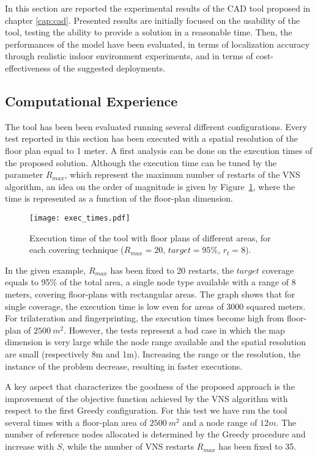 In this section are reported the experimental results of the CAD tool proposed in chapter \ref{cap:cad}.
Presented results are initially focused on the usability of the tool, testing the ability to provide a solution in a reasonable time. Then, the performances of the model have been evaluated, in terms of localization accuracy through realistic indoor environment experiments, and in terms of cost-effectiveness of the suggested deployments.

\subsection{Computational Experience}\label{subsec:comp_res}
The tool has been been evaluated running several different configurations. Every test reported in this section has been executed with a spatial resolution of the floor plan equal to 1 meter.  A first analysis can be done on the execution times of the proposed solution. Although the execution time can be tuned by the parameter $R_{max}$, which represent the maximum number of restarts of the VNS algorithm, an idea on the order of magnitude is given by Figure~\ref{fig:time}, where the time is represented as a function of the floor-plan dimension.
\begin{figure}[h!tb]
\centering\texttt{[image: exec\_times.pdf]}
\caption{Execution time of the tool with floor plans of different areas, for each covering technique ($R_{max} = 20$, $target = 95\%$, $r_t=8$).}
\label{fig:time}
\end{figure}
In the given example, $R_{max}$ has been fixed to 20 restarts, the $target$ coverage equals to 95\% of the total area, a single node type available with a range of 8 meters, covering floor-plans with rectangular areas. The graph shows that for single coverage, the execution time is low even for areas of 3000 squared meters. For trilateration and fingerprinting, the execution times become high from floor-plan of $2500~m^2$. However, the tests represent a bad case in which the map dimension is very large while the node range available and the spatial resolution are small (respectively 8m and 1m). Increasing the range or the resolution, the instance of the problem decrease, resulting in faster executions.

A key aspect that characterizes the goodness of the proposed approach is the improvement of the objective function achieved by the VNS algorithm with respect to the first Greedy configuration. For this test we have run the tool several times with a floor-plan area of $2500~m^2$ and a node range of $12m$. The number of reference nodes allocated is determined by the Greedy procedure and increase with $S$, while the number of VNS restarts $R_{max}$ has been fixed to 35.

